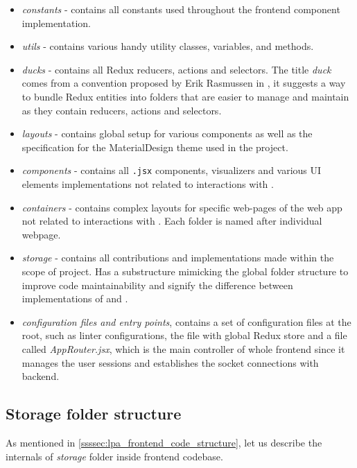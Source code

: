 \begin{itemize}
    \item \textit{constants} - contains all constants used throughout the frontend component implementation.
    \item \textit{utils} - contains various handy utility classes, variables, and methods.
    \item \textit{ducks} - contains all Redux reducers, actions and selectors. The title \textit{duck} comes from a convention proposed by Erik Rasmussen in \cite{redux_ducks}, it suggests a way to bundle Redux entities into folders that are easier to manage and maintain as they contain reducers, actions and selectors.
    \item \textit{layouts} - contains global setup for various components as well as the specification for the MaterialDesign theme used in the project.
    \item \textit{components} - contains all \texttt{.jsx} components, visualizers and various UI elements implementations not related to interactions with \solid{}.
    \item \textit{containers} - contains complex layouts for specific web-pages of the web app not related to interactions with \solid{}. Each folder is named after individual webpage. 
    \item \textit{storage} - contains all contributions and implementations made within the scope of \lpas{} project. Has a substructure mimicking the global folder structure to improve code maintainability and signify the difference between implementations of \lpa{} and \lpas{}.
    \item \textit{configuration files and entry points}, contains a set of configuration files at the root, such as linter configurations, the file with global Redux store and a file called \textit{AppRouter.jsx}, which is the main controller of whole frontend since it manages the user sessions and establishes the socket connections with \lpa{} backend.
\end{itemize}

\subsection{Storage folder structure}
\label{sssec:storage_folder_structure}

As mentioned in \autoref{ssssec:lpa_frontend_code_structure}, let us describe the internals of \textit{storage} folder inside \lpa{} frontend codebase. 

